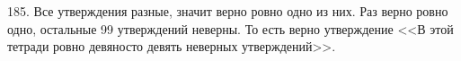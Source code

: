185. Все утверждения разные, значит верно ровно одно из них. Раз верно ровно одно, остальные 99 утверждений неверны. То есть верно утверждение <<В этой тетради ровно девяносто девять неверных утверждений>>.\\
